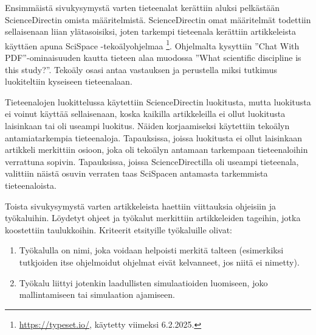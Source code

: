 \documentclass[utf8]{gradu3}
\begin{document}
\begin{table}[h]
\centering
{}
\caption{Testauserän kategoriat}
\label{table: testausera}
\end{table}

Ensimmäistä sivukysymystä varten tieteenalat kerättiin aluksi 
pelkästään ScienceDirectin omista määritelmistä. 
ScienceDirectin omat määritelmät todettiin sellaisenaan liian ylätasoisiksi, 
joten tarkempi tieteenala kerättiin artikkeleista käyttäen apuna 
SciSpace -tekoälyohjelmaa 
\footnote{\url{https://typeset.io/}, käytetty viimeksi 6.2.2025.}. 
Ohjelmalta kysyttiin ''Chat With PDF''-ominaisuuden 
kautta tieteen alaa muodossa ''What scientific discipline is this study?''. 
Tekoäly osasi antaa vastauksen ja perustella miksi tutkimus 
luokiteltiin kyseiseen tieteenalaan. 

Tieteenalojen luokittelussa käytettiin ScienceDirectin luokitusta, mutta
luokitusta ei voinut käyttää sellaisenaan, 
koska kaikilla artikkeleilla ei ollut luokitusta laisinkaan tai oli useampi luokitus. 
Näiden korjaamiseksi käytettiin tekoälyn antamiatarkempia tieteenaloja.
Tapauksissa, joissa luokitusta ei ollut laisinkaan artikkeli merkittiin osioon,
joka oli tekoälyn antamaan tarkempaan tieteenaloihin verrattuna sopivin.
Tapauksissa, joissa ScienceDirectilla oli useampi tieteenala, valittiin näistä
osuvin verraten taas SciSpacen antamasta tarkemmista tieteenaloista.

Toista sivukysymystä varten artikkeleista haettiin viittauksia ohjeisiin ja työkaluihin. Löydetyt ohjeet ja työkalut merkittiin artikkeleiden tageihin, jotka koostettiin taulukkoihin.
Kriteerit etsityille työkaluille olivat:
\begin{enumerate}
    \item Työkalulla on nimi, joka voidaan helpoisti merkitä talteen (esimerkiksi tutkjoiden itse ohjelmoidut ohjelmat eivät kelvanneet, jos niitä ei nimetty).
    \item Työkalu liittyi jotenkin laadullisten simulaatioiden luomiseen, joko
    mallintamiseen tai simulaation ajamiseen.
\end{enumerate}
\end{document}
